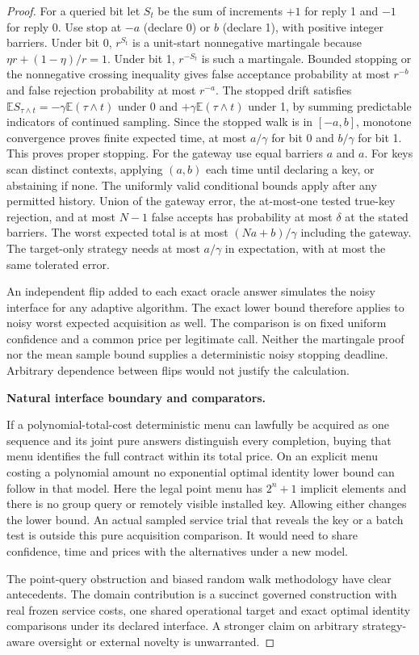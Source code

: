 \begin{proof}
For a queried bit let \(S_t\) be the sum of increments \(+1\) for reply 1 and \(-1\) for reply 0. Use stop at \(-a\) (declare 0) or \(b\) (declare 1), with positive integer barriers. Under bit 0, \(r^{S_t}\) is a unit-start nonnegative martingale because \(\eta r+(1-\eta)/r=1\). Under bit 1, \(r^{-S_t}\) is such a martingale. Bounded stopping or the nonnegative crossing inequality gives false acceptance probability at most \(r^{-b}\) and false rejection probability at most \(r^{-a}\). The stopped drift satisfies \(\mathbb E S_{\tau\land t}=-\gamma\mathbb E(\tau\land t)\) under 0 and \(+\gamma\mathbb E(\tau\land t)\) under 1, by summing predictable indicators of continued sampling. Since the stopped walk is in \([-a,b]\), monotone convergence proves finite expected time, at most \(a/\gamma\) for bit 0 and \(b/\gamma\) for bit 1. This proves proper stopping. For the gateway use equal barriers \(a\) and \(a\). For keys scan distinct contexts, applying \((a,b)\) each time until declaring a key, or abstaining if none. The uniformly valid conditional bounds apply after any permitted history. Union of the gateway error, the at-most-one tested true-key rejection, and at most \(N-1\) false accepts has probability at most \(\delta\) at the stated barriers. The worst expected total is at most \((Na+b)/\gamma\) including the gateway. The target-only strategy needs at most \(a/\gamma\) in expectation, with at most the same tolerated error.

An independent flip added to each exact oracle answer simulates the noisy interface for any adaptive algorithm. The exact lower bound therefore applies to noisy worst expected acquisition as well. The comparison is on fixed uniform confidence and a common price per legitimate call. Neither the martingale proof nor the mean sample bound supplies a deterministic noisy stopping deadline. Arbitrary dependence between flips would not justify the calculation.

\textbf{Natural interface boundary and comparators.}

If a polynomial-total-cost deterministic menu can lawfully be acquired as one sequence and its joint pure answers distinguish every completion, buying that menu identifies the full contract within its total price. On an explicit menu costing a polynomial amount no exponential optimal identity lower bound can follow in that model. Here the legal point menu has \(2^n+1\) implicit elements and there is no group query or remotely visible installed key. Allowing either changes the lower bound. An actual sampled service trial that reveals the key or a batch test is outside this pure acquisition comparison. It would need to share confidence, time and prices with the alternatives under a new model.

The point-query obstruction and biased random walk methodology have clear antecedents. The domain contribution is a succinct governed construction with real frozen service costs, one shared operational target and exact optimal identity comparisons under its declared interface. A stronger claim on arbitrary strategy-aware oversight or external novelty is unwarranted.

\end{proof}

